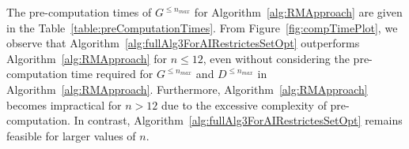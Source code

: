\documentclass[11pt]{llncs}
\begin{document}
The pre-computation times of $G^{\leq n_{max}}$ for Algorithm~\ref{alg:RMApproach} are given in the Table~\ref{table:preComputationTimes}. From Figure~\ref{fig:compTimePlot}, we observe that Algorithm~\ref{alg:fullAlg3ForAIRestrictesSetOpt} outperforms Algorithm~\ref{alg:RMApproach} for $n \leq 12$, even without considering the pre-computation time required for $G^{\leq n_{max}}$ and $D^{\leq n_{max}}$ in Algorithm~\ref{alg:RMApproach}. Furthermore, Algorithm~\ref{alg:RMApproach} becomes impractical for $n > 12$ due to the excessive complexity of pre-computation. In contrast, Algorithm~\ref{alg:fullAlg3ForAIRestrictesSetOpt} remains feasible for larger values of $n$. 

\begin{table}[H]
\centering
{}
\caption{Pre-computation time (in seconds) for $G^{\leq n_{max}}$ for $n_{max}$ from $1$ to $12$.}\label{table:preComputationTimes}
\end{table}
\end{document}
